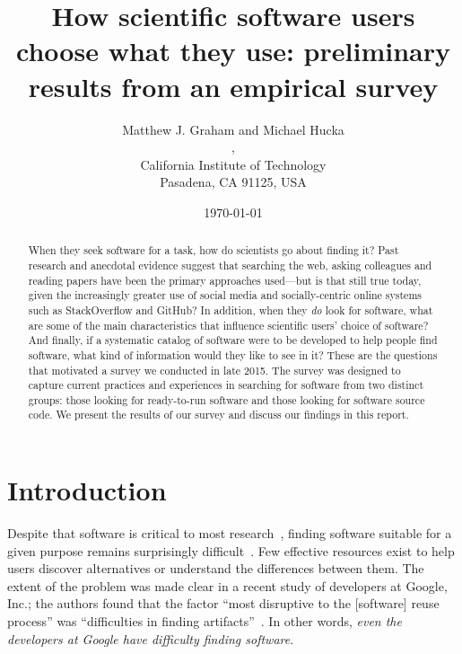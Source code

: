 \documentclass{casicswhitepaper}
\begin{document}
\title{How scientific software users choose what they use: preliminary results from an empirical survey}
\date{\today}
\author{Matthew J. Graham and Michael Hucka\\
,\quad{}\\
California Institute of Technology\\
Pasadena, CA 91125, USA}
\maketitle

\begin{abstract}
When they seek software for a task, how do scientists go about finding it?  Past research and anecdotal evidence suggest that searching the web, asking colleagues and reading papers have been the primary approaches used---but is that still true today, given the increasingly greater use of social media and socially-centric online systems such as StackOverflow and GitHub?  In addition, when they \emph{do} look for software, what are some of the main characteristics that influence scientific users' choice of software?  And finally, if a systematic catalog of software were to be developed to help people find software, what kind of information would they like to see in it?  These are the questions that motivated a survey we conducted in late 2015.  The survey was designed to capture current practices and experiences in searching for software from two distinct groups: those looking for ready-to-run software and those looking for software source code.  We present the results of our survey and discuss our findings in this report.
\end{abstract}


\section{Introduction}

Despite that software is critical to most research~\citep{bauer2014exploratory, hettrick_2014, hannay_2009, baxter_2006, wilson_2006}, finding software suitable for a given purpose remains surprisingly difficult~\cite{cannata_2005, Bourne::2015, SoftwareDiscoveryIndex:2014}.  Few effective resources exist to help users discover alternatives or understand the differences between them.  The extent of the problem was made clear in a recent study of developers at Google, Inc.; the authors found that the factor ``most disruptive to the [software] reuse process'' was ``difficulties in finding artifacts''~\cite{bauer2014exploratory}.  In other words, \emph{even the developers at Google have difficulty finding software}.
\end{document}
